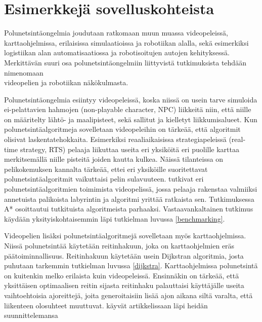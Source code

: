 \section{Esimerkkejä sovelluskohteista}\label{eSuovelluskohteista}
Polunetsintäongelmia joudutaan ratkomaan muun muassa videopeleissä, 
karttaohjelmissa, erilaisissa simulaatioissa ja robotiikan alalla,
\cite{ACMHindawi} sekä esimerkiksi logistiikan alan automatisaatiossa ja 
robotisoitujen autojen kehityksessä.\cite{arXivMAPF} Merkittävän suuri 
osa polunetsintäongelmiin liittyvistä tutkimuksista tehdään nimenomaan 
\\videopelien\cite{MathewAndMalathy}\cite{ACMHindawi}\cite{mazeGameTrilogi}
ja robotiikan\cite{ACMHindawi}\cite{DelaunayVoronoiAStar} näkökulmasta.\par
	Polunetsintäongelmia esiintyy videopeleissä, koska niissä on usein 
tarve simuloida ei-pelattavien hahmojen (non-playable character, NPC) 
liikkeitä niin, että niille on määritelty lähtö- ja maalipisteet, sekä 
sallitut ja kielletyt liikkumisalueet. Kun polunetsintäalgoritmeja 
sovelletaan videopeleihin on tärkeää, että algoritmit olisivat 
laskentatehokkaita. Esimerkiksi reaaliaikaisissa strategiapeleissä 
(real-time strategy, RTS) pelaaja liikuttaa useita eri yksiköitä eri puolille 
karttaa merkitsemällä niille pisteitä joiden kautta kulkea. Näissä 
tilanteissa on pelikokemuksen kannalta tärkeää, ettei eri yksiköille 
suoritettavat polunetsintäalgoritmit vaikuttaisi pelin 
sulavuuteen.\cite{MathewAndMalathy} \textcite{mazeGameTrilogi} tutkivat 
eri polunetsintäalgoritmien toimimista videopelissä, jossa pelaaja rakenstaa 
valmiiksi annetuista palikoista labyrintin ja algoritmi yrittää ratkaista 
sen. Tutkimuksessa A* osoittautui tutkituista algoritmeista parhaaksi. 
Vastaavankaltainen tutkimus käydään yksityiskohtaisemmin läpi tutkielman 
luvussa \ref{benchmarking}. \par
	Videopelien lisäksi polunetsintäalgoritmejä sovelletaan myös 
karttaohjelmissa. Niissä polunetsintää käytetään reitinhakuun, joka on 
karttaohjelmien eräs päätoiminnallisuus. Reitinhakuun käytetään usein 
Dijkstran algoritmia,\cite{IOPDijkstra} josta puhutaan tarkemmin tutkielman 
luvussa \ref{dijkstra}. Karttaohjelmissa polunetsintä on kuitenkin melko 
erilaista kuin videopeleissä. Ensinnäkin on tärkeää, että yksittäisen 
optimaalisen reitin sijasta reitinhaku palauttaisi käyttäjälle useita 
vaihtoehtoisia ajoreittejä, joita generoitaisiin lisää ajon aikana siltä 
varalta, että liikenteen olosuhteet muuttuvat.\cite{Lanelet2} 
\textcite{Lanelet2} käyvät artikkelissaan läpi heidän suunnittelemansa 
